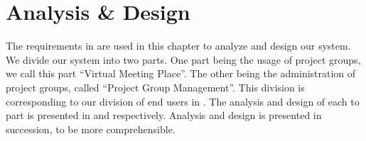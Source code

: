 \chapter{Analysis \& Design}
%
\label{chap:analysis}%
\label{chap:design}%
\label{chap:analdesign}%
The requirements in  are used in this chapter to analyze and design our system.
We divide our system into two parts.
One part being the usage of project groups, we call this part ``Virtual Meeting Place''.
The other being the administration of project groups, called ``Project Group Management''.
This division is corresponding to our division of end users in .
The analysis and design of each to part is presented in  and  respectively.
Analysis and design is presented in succession, to be more comprehensible.






